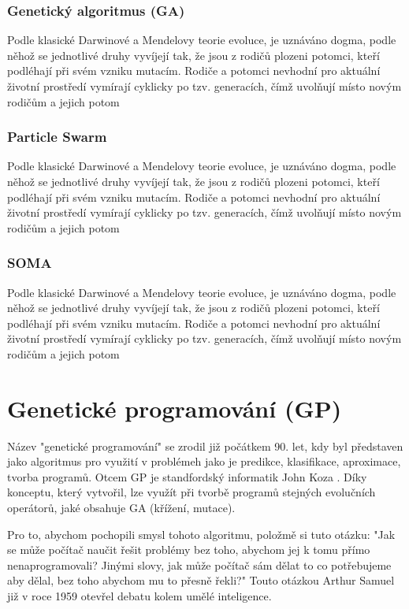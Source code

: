 \documentclass[bc,male,java,dept460]{diploma}		%
\begin{document}
\subsubsection{Genetický algoritmus (GA)}
Podle klasické Darwinové a Mendelovy teorie evoluce, je uznáváno dogma, podle něhož se jednotlivé druhy vyvíjejí tak, že jsou z rodičů plozeni potomci, kteří podléhají při svém vzniku mutacím. Rodiče a potomci nevhodní pro aktuální životní prostředí vymírají cyklicky po tzv. generacích, čímž uvolňují místo novým rodičům a jejich potom

\subsubsection{Particle Swarm}
Podle klasické Darwinové a Mendelovy teorie evoluce, je uznáváno dogma, podle něhož se jednotlivé druhy vyvíjejí tak, že jsou z rodičů plozeni potomci, kteří podléhají při svém vzniku mutacím. Rodiče a potomci nevhodní pro aktuální životní prostředí vymírají cyklicky po tzv. generacích, čímž uvolňují místo novým rodičům a jejich potom

\subsubsection{SOMA}
Podle klasické Darwinové a Mendelovy teorie evoluce, je uznáváno dogma, podle něhož se jednotlivé druhy vyvíjejí tak, že jsou z rodičů plozeni potomci, kteří podléhají při svém vzniku mutacím. Rodiče a potomci nevhodní pro aktuální životní prostředí vymírají cyklicky po tzv. generacích, čímž uvolňují místo novým rodičům a jejich potom

\section{Genetické programování (GP)}
Název "genetické programování" se zrodil již počátkem 90. let, kdy byl představen jako algoritmus pro využití v problémeh jako je predikce, klasifikace, aproximace, tvorba programů.
Otcem GP je standfordský informatik John Koza \cite{kozagp,kozagp2}. Díky konceptu, který vytvořil, lze využít při tvorbě programů stejných evolučních operátorů, jaké obsahuje GA (křížení, mutace).

Pro to, abychom pochopili smysl tohoto algoritmu, položmě si tuto otázku: "Jak se může počítač naučit řešit  problémy bez toho, abychom jej k tomu přímo nenaprogramovali? Jinými slovy, jak může počítač sám dělat to co potřebujeme aby dělal, bez toho abychom mu to přesně řekli?" Touto otázkou Arthur Samuel již v roce 1959 otevřel debatu kolem umělé inteligence.
\end{document}
